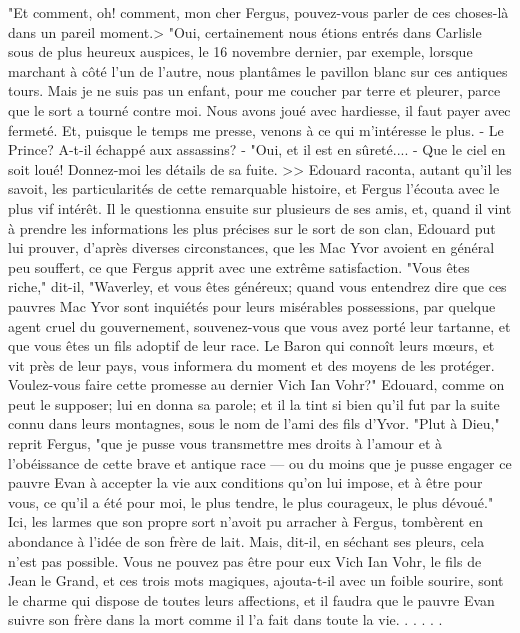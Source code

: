 "Et comment, oh! comment, mon cher Fergus, pouvez-vous parler de ces choses-là dans un pareil moment.>
"Oui, certainement nous étions entrés dans Carlisle sous de plus heureux auspices, le 16 novembre dernier, par exemple, lorsque marchant à côté l'un de l'autre, nous plantâmes le pavillon blanc sur ces antiques tours. Mais je ne suis pas un enfant, pour me coucher par terre et pleurer, parce que le sort a tourné contre moi. Nous avons joué avec hardiesse, il faut payer avec fermeté. Et, puisque le temps me presse, venons à ce qui m'intéresse le plus. - Le Prince? A-t-il échappé aux assassins?
- "Oui, et il est en sûreté....
- Que le ciel en soit loué! Donnez-moi les détails de sa fuite. >>\setcounter{page}{385} Edouard raconta, autant qu'il les savoit, les particularités de cette remarquable histoire, et Fergus l'écouta avec le plus vif intérêt. Il le questionna ensuite sur plusieurs de ses amis, et, quand il vint à prendre les informations les plus précises sur le sort de son clan, Edouard put lui prouver, d'après diverses circonstances, que les Mac Yvor avoient en général peu souffert, ce que Fergus apprit avec une extrême satisfaction. "Vous êtes riche," dit-il, "Waverley, et vous êtes généreux; quand vous entendrez dire que ces pauvres Mac Yvor sont inquiétés pour leurs misérables possessions, par quelque agent cruel du gouvernement, souvenez-vous que vous avez porté leur tartanne, et que vous êtes un fils adoptif de leur race. Le Baron qui connoît leurs mœurs, et vit près de leur pays, vous informera du moment et des moyens de les protéger. Voulez-vous faire cette promesse au dernier Vich Ian Vohr?"
Edouard, comme on peut le supposer; lui en donna sa parole; et il la tint si bien qu'il fut par la suite connu dans leurs montagnes, sous le nom de l'ami des fils d'Yvor. "Plut à Dieu," reprit Fergus, "que je pusse vous transmettre mes droits à l'amour\setcounter{page}{386} et à l'obéissance de cette brave et antique race — ou du moins que je pusse engager ce pauvre Evan à accepter la vie aux conditions qu'on lui impose, et à être pour vous, ce qu'il a été pour moi, le plus tendre, le plus courageux, le plus dévoué." Ici, les larmes que son propre sort n'avoit pu arracher à Fergus, tombèrent en abondance à l'idée de son frère de lait.
Mais, dit-il, en séchant ses pleurs, cela n'est pas possible. Vous ne pouvez pas être pour eux Vich Ian Vohr, le fils de Jean le Grand, et ces trois mots magiques, ajouta-t-il avec un foible sourire, sont le charme qui dispose de toutes leurs affections, et il faudra que le pauvre Evan suivre son frère dans la mort comme il l'a fait dans toute la vie. . . . . .
